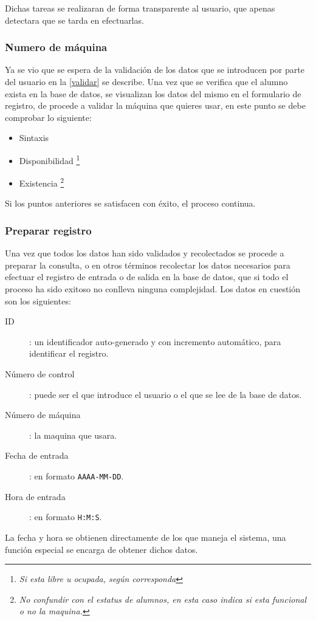 \documentclass[12pt]{article} %
\begin{document}
			Dichas tareas se realizaran de forma transparente al usuario, que apenas detectara que se tarda en efectuarlas.
		\subsubsection{Numero de m\'aquina \label{maquina}}
			
			Ya se vio  que se espera de la validación de los datos que se introducen por parte del usuario en la  \ref{validar} se describe.
			Una vez que se verifica que el alumno exista en la base de datos, se visualizan los datos del mismo en el formulario de registro, de procede a validar la m\'aquina
			que quieres usar, en este punto se debe comprobar lo siguiente:
			\begin{itemize}
				\item Sintaxis
				\item Disponibilidad  \footnote{\scriptsize \textit{Si esta libre u ocupada, según corresponda}}
				\item Existencia \footnote{\scriptsize \textit{No confundir con el estatus de alumnos, en esta caso indica si esta funcional o no la maquina.}}
			\end{itemize}
			Si los puntos anteriores se satisfacen con éxito, el proceso continua.
			
		\subsubsection{Preparar registro \label{consulta}}
			Una vez que todos los datos han sido validados y recolectados se procede a preparar la consulta, o en otros términos recolectar los datos necesarios para efectuar
			el registro de entrada o de salida en la base de datos, que si todo el proceso ha sido exitoso no conlleva ninguna complejidad.
			Los datos en cuestión son los siguientes:
			\begin{description}
				\item[ID]: un identificador auto-generado y con incremento automático, para identificar el registro. 
				\item[N\'umero de control]: puede ser el que introduce el usuario o el que se lee de la base de datos.
				\item[N\'umero de m\'aquina]: la maquina que usara.
				\item[Fecha de entrada]: en formato \texttt{AAAA-MM-DD}.
				\item[Hora de entrada]: en formato \texttt{H:M:S}.
			\end{description}
			La fecha y hora se obtienen directamente de los que maneja el sistema, una función especial se encarga de obtener dichos datos.
		
\end{document}
